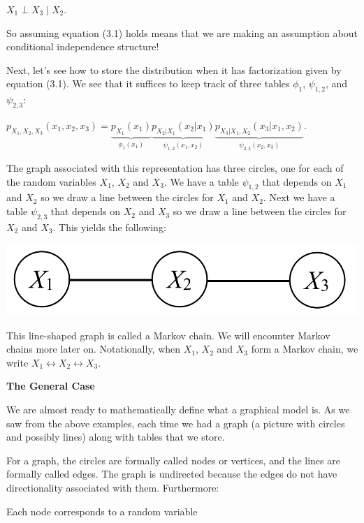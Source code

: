 \documentclass[6008notes.tex]{subfiles}
\begin{document}
{\centering$X_1 \perp X_3 \mid X_2.$ \par}
 
So assuming equation (3.1) holds means that we are making an assumption about conditional independence structure!

Next, let's see how to store the distribution when it has factorization given by equation (3.1). We see that it suffices to keep track of three tables $\phi_1$, $\psi_{1, 2}$, and $\psi_{2, 3}$:

{\centering$p_{X_1,X_2,X_3}(x_1,x_2,x_3) = \underbrace{p_{X_1}(x_1)}_{\phi _1(x_1)} \underbrace{p_{X_2|X_1}(x_2|x_1)}_{\psi _{1, 2}(x_1, x_2)} \underbrace{p_{X_3|X_1, X_2}(x_3|x_1, x_2)}_{\psi _{2, 3}(x_2, x_3)}.$ \par}
 
The graph associated with this representation has three circles, one for each of the random variables $X_1$, $X_2$ and $X_3$. We have a table $\psi_{1, 2}$ that depends on $X_1$ and $X_2$ so we draw a line between the circles for $X_1$ and $X_2$. Next we have a table $\psi _{2, 3}$ that depends on $X_2$ and $X_3$ so we draw a line between the circles for $X_2$ and $X_3$. This yields the following:

{\centering\includegraphics[scale=0.4]{images_sec-graphical-models-3-rv-markov-chain} \par}

This line-shaped graph is called a Markov chain. We will encounter Markov chains more later on. Notationally, when $X_1$, $X_2$ and $X_3$ form a Markov chain, we write $X_1 \leftrightarrow X_2 \leftrightarrow X_3$.

\textbf{The General Case}

We are almost ready to mathematically define what a graphical model is. As we saw from the above examples, each time we had a graph (a picture with circles and possibly lines) along with tables that we store.

For a graph, the circles are formally called nodes or vertices, and the lines are formally called edges. The graph is undirected because the edges do not have directionality associated with them. Furthermore:

Each node corresponds to a random variable
\end{document}
